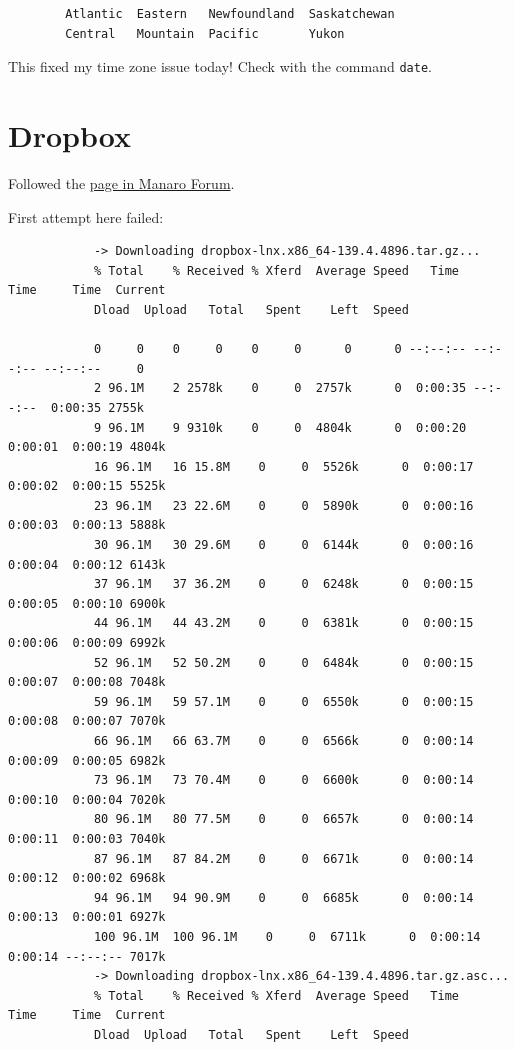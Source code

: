 \documentclass[]{scrartcl}
\begin{document}
	\begin{verbatim}
		Atlantic  Eastern   Newfoundland  Saskatchewan
		Central   Mountain  Pacific       Yukon
	\end{verbatim}
	
	This fixed my time zone issue today! Check with the command \texttt{date}.
	
	\section{Dropbox}
	
	Followed the \href{https://forum.manjaro.org/t/dropbox-install-new-to-manjaro/9576/5}{page in Manaro Forum}.
	
	First attempt here failed:
	\begin{small}
		\begin{verbatim}
			-> Downloading dropbox-lnx.x86_64-139.4.4896.tar.gz...
			% Total    % Received % Xferd  Average Speed   Time    Time     Time  Current
			Dload  Upload   Total   Spent    Left  Speed
			
			0     0    0     0    0     0      0      0 --:--:-- --:--:-- --:--:--     0
			2 96.1M    2 2578k    0     0  2757k      0  0:00:35 --:--:--  0:00:35 2755k
			9 96.1M    9 9310k    0     0  4804k      0  0:00:20  0:00:01  0:00:19 4804k
			16 96.1M   16 15.8M    0     0  5526k      0  0:00:17  0:00:02  0:00:15 5525k
			23 96.1M   23 22.6M    0     0  5890k      0  0:00:16  0:00:03  0:00:13 5888k
			30 96.1M   30 29.6M    0     0  6144k      0  0:00:16  0:00:04  0:00:12 6143k
			37 96.1M   37 36.2M    0     0  6248k      0  0:00:15  0:00:05  0:00:10 6900k
			44 96.1M   44 43.2M    0     0  6381k      0  0:00:15  0:00:06  0:00:09 6992k
			52 96.1M   52 50.2M    0     0  6484k      0  0:00:15  0:00:07  0:00:08 7048k
			59 96.1M   59 57.1M    0     0  6550k      0  0:00:15  0:00:08  0:00:07 7070k
			66 96.1M   66 63.7M    0     0  6566k      0  0:00:14  0:00:09  0:00:05 6982k
			73 96.1M   73 70.4M    0     0  6600k      0  0:00:14  0:00:10  0:00:04 7020k
			80 96.1M   80 77.5M    0     0  6657k      0  0:00:14  0:00:11  0:00:03 7040k
			87 96.1M   87 84.2M    0     0  6671k      0  0:00:14  0:00:12  0:00:02 6968k
			94 96.1M   94 90.9M    0     0  6685k      0  0:00:14  0:00:13  0:00:01 6927k
			100 96.1M  100 96.1M    0     0  6711k      0  0:00:14  0:00:14 --:--:-- 7017k
			-> Downloading dropbox-lnx.x86_64-139.4.4896.tar.gz.asc...
			% Total    % Received % Xferd  Average Speed   Time    Time     Time  Current
			Dload  Upload   Total   Spent    Left  Speed
			

\end{verbatim}
\end{small}
\end{document}
